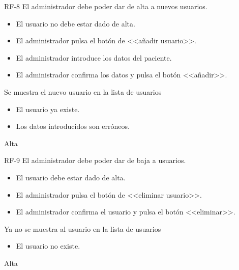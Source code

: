 {RF-8}
{El administrador debe poder dar de alta a nuevos usuarios.}
{	\begin{itemize}
	\def\labelenumi{\arabic{enumi}.}
	\tightlist
	\item El usuario no debe estar dado de alta.
	\end{itemize}}
{
	\begin{itemize}
	\def\labelenumi{\arabic{enumi}.}
	\tightlist

    \item El administrador pulsa el botón de <<añadir usuario>>.
    \item El administrador introduce los datos del paciente.
    \item El administrador confirma los datos y pulsa el botón <<añadir>>.
    \end{itemize}
}
{Se muestra el nuevo usuario en la lista de usuarios}
{\begin{itemize}
	\def\labelenumi{\arabic{enumi}.}
	\tightlist

    \item El usuario ya existe.
    \item Los datos introducidos son erróneos.
    \end{itemize}}
{Alta}

{RF-9}
{El administrador debe poder dar de baja a usuarios.}
{	\begin{itemize}
	\def\labelenumi{\arabic{enumi}.}
	\tightlist
	\item El usuario debe estar dado de alta.
	\end{itemize}}
{
	\begin{itemize}
	\def\labelenumi{\arabic{enumi}.}
	\tightlist

    \item El administrador pulsa el botón de <<eliminar usuario>>.
    \item El administrador confirma el usuario y pulsa el botón <<eliminar>>.
    \end{itemize}
}
{Ya no se muestra al usuario en la lista de usuarios}
{\begin{itemize}
	\def\labelenumi{\arabic{enumi}.}
	\tightlist

    \item El usuario no existe.
    \end{itemize}}
{Alta}

